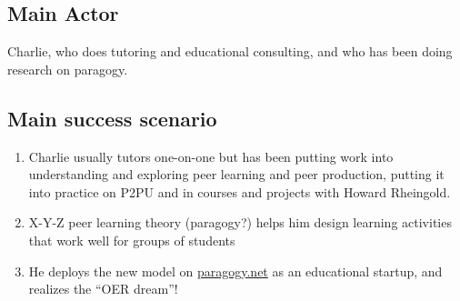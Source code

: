 \subsection{Main Actor}

Charlie, who does tutoring and educational consulting, and who has been
doing research on paragogy.

\subsection{Main success scenario}

\begin{enumerate}
\item
  Charlie usually tutors one-on-one but has been putting work into
  understanding and exploring peer learning and peer production, putting
  it into practice on P2PU and in courses and projects with Howard
  Rheingold.
\item
  X-Y-Z peer learning theory (paragogy?) helps him design learning
  activities that work well for groups of students
\item
  He deploys the new model on \href{http://paragogy.net}{paragogy.net}
  as an educational startup, and realizes the ``OER dream''!
\end{enumerate}
